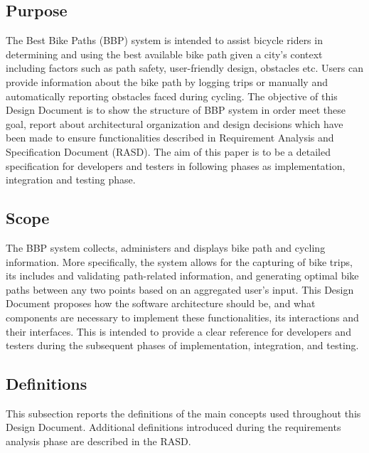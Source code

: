 \subsection{Purpose}

The Best Bike Paths (BBP) system is intended to assist bicycle riders in determining and using the best available bike path given a city's context including factors such as path safety, user-friendly design, obstacles etc.
Users can provide information about the bike path by logging trips or manually and automatically reporting obstacles faced during cycling.
The objective of this Design Document is to show the structure of BBP system in order meet these goal, report about architectural organization and design decisions which have been made to ensure functionalities described in Requirement Analysis and Specification Document (RASD).
The aim of this paper is to be a detailed specification for developers and testers in following phases as implementation, integration and testing phase.

\subsection{Scope}

The BBP system collects, administers and displays bike path and cycling information. More specifically, the system allows for the capturing of bike trips, its includes and validating path-related information, and generating optimal bike paths between any two points based on an aggregated user's input.
This Design Document proposes how the software architecture should be, and what components are necessary to implement these functionalities, its interactions and their interfaces.
This is intended to provide a clear reference for developers and testers during the subsequent phases of implementation, integration, and testing.

\subsection{Definitions}

This subsection reports the definitions of the main concepts used throughout this Design Document. Additional definitions introduced during the requirements analysis phase are described in the RASD.

